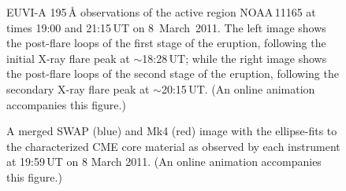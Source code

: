 \documentclass[namedreferences]{solarphysics}
\begin{document}
\begin{article}
\begin{figure}[!t]
\caption{EUVI-A 195\,{\AA} observations of the active region NOAA\,11165 at times 19:00 and 21:15\,UT on 8~March~2011. The left image shows the post-flare loops of the first stage of the eruption, following the initial X-ray flare peak at $\sim$18:28\,UT; while the right image shows the post-flare loops of the second stage of the eruption, following the secondary X-ray flare peak at $\sim$20:15\,UT. (An online animation accompanies this figure.)}
\label{euvi}
\end{figure}

\begin{figure}[t]
\caption{A merged SWAP (blue) and Mk4 (red) image with the ellipse-fits to the characterized CME core material as observed by each instrument at 19:59\,UT on 8 March 2011. (An online animation accompanies this figure.)}
\label{combined}
\end{figure}


\end{article}
\end{document}
